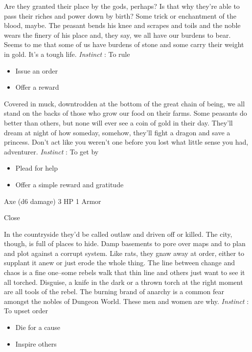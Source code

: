 

 Are they granted their place by the gods, perhaps? Is that why they're able to pass their riches and power down by birth? Some trick or enchantment of the blood, maybe. The peasant bends his knee and scrapes and toils and the noble wears the finery of his place and, they say, we all have our burdens to bear. Seems to me that some of us have burdens of stone and some carry their weight in gold. It's a tough life. \emph{Instinct}
: To rule
\begin{itemize}
\item Issue an order
\item Offer a reward

\end{itemize}




 Covered in muck, downtrodden at the bottom of the great chain of being, we all stand on the backs of those who grow our food on their farms. Some peasants do better than others, but none will ever see a coin of gold in their day. They'll dream at night of how someday, somehow, they'll fight a dragon and save a princess. Don't act like you weren't one before you lost what little sense you had, adventurer. \emph{Instinct}
: To get by
\begin{itemize}
\item Plead for help
\item Offer a simple reward and gratitude

\end{itemize}




 Axe (d6 damage) 3 HP 1 Armor


 Close


 In the countryside they'd be called outlaw and driven off or killed. The city, though, is full of places to hide. Damp basements to pore over maps and to plan and plot against a corrupt system. Like rats, they gnaw away at order, either to supplant it anew or just erode the whole thing. The line between change and chaos is a fine one--some rebels walk that thin line and others just want to see it all torched. Disguise, a knife in the dark or a thrown torch at the right moment are all tools of the rebel. The burning brand of anarchy is a common fear amongst the nobles of Dungeon World. These men and women are why. \emph{Instinct}
: To upset order
\begin{itemize}
\item Die for a cause
\item Inspire others

\end{itemize}


